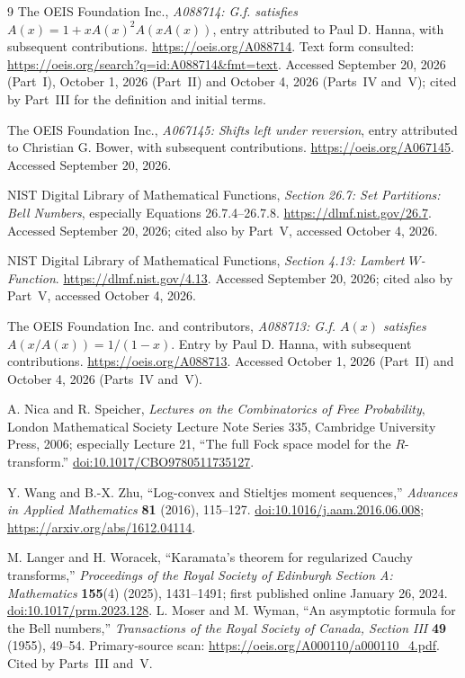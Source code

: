 \documentclass[11pt]{article}
\numberwithin{equation}{section}
\theoremstyle{definition}
\theoremstyle{remark}
\begin{document}
\begin{thebibliography}{9}
The OEIS Foundation Inc., \emph{A088714: G.f. satisfies
$A(x)=1+xA(x)^2A(xA(x))$}, entry attributed to Paul D. Hanna,
with subsequent contributions.
\url{https://oeis.org/A088714}.
Text form consulted: \url{https://oeis.org/search?q=id:A088714&fmt=text}.
Accessed September 20, 2026 (Part~I), October 1, 2026 (Part~II) and
October 4, 2026 (Parts~IV and~V); cited by Part~III for the definition
and initial terms.

The OEIS Foundation Inc., \emph{A067145: Shifts left under reversion},
entry attributed to Christian G. Bower, with subsequent contributions.
\url{https://oeis.org/A067145}.
Accessed September 20, 2026.

NIST Digital Library of Mathematical Functions,
\emph{Section 26.7: Set Partitions: Bell Numbers}, especially
Equations 26.7.4--26.7.8.
\url{https://dlmf.nist.gov/26.7}.
Accessed September 20, 2026; cited also by Part~V, accessed October 4, 2026.

NIST Digital Library of Mathematical Functions,
\emph{Section 4.13: Lambert $W$-Function}.
\url{https://dlmf.nist.gov/4.13}.
Accessed September 20, 2026; cited also by Part~V, accessed October 4, 2026.

The OEIS Foundation Inc. and contributors,
\emph{A088713: G.f. $A(x)$ satisfies $A(x/A(x))=1/(1-x)$}.
Entry by Paul D. Hanna, with subsequent contributions.
\url{https://oeis.org/A088713}. Accessed October 1, 2026 (Part~II) and
October 4, 2026 (Parts~IV and~V).

A. Nica and R. Speicher,
\emph{Lectures on the Combinatorics of Free Probability},
London Mathematical Society Lecture Note Series 335,
Cambridge University Press, 2006; especially Lecture 21,
``The full Fock space model for the $R$-transform.''
\href{https://doi.org/10.1017/CBO9780511735127}{doi:10.1017/CBO9780511735127}.

Y. Wang and B.-X. Zhu,
``Log-convex and Stieltjes moment sequences,''
\emph{Advances in Applied Mathematics} \textbf{81} (2016), 115--127.
\href{https://doi.org/10.1016/j.aam.2016.06.008}{doi:10.1016/j.aam.2016.06.008};
\url{https://arxiv.org/abs/1612.04114}.

M. Langer and H. Woracek,
``Karamata's theorem for regularized Cauchy transforms,''
\emph{Proceedings of the Royal Society of Edinburgh Section A:
Mathematics} \textbf{155}(4) (2025), 1431--1491;
first published online January 26, 2024.
\href{https://doi.org/10.1017/prm.2023.128}{doi:10.1017/prm.2023.128}.
L. Moser and M. Wyman,
``An asymptotic formula for the Bell numbers,''
\emph{Transactions of the Royal Society of Canada, Section III}
\textbf{49} (1955), 49--54.
Primary-source scan: \url{https://oeis.org/A000110/a000110_4.pdf}.
Cited by Parts~III and~V.


\end{thebibliography}
\end{document}
